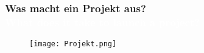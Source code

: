 \documentclass[13pt]{beamer}
\begin{document}
{
\begin{frame}
  \frametitle{Was macht ein Projekt aus? \\ \textcolor{white}{What does it take to launch a project?}}
  \begin{figure}
  \texttt{[image: Projekt.png]}
  \end{figure}
  \bigskip
\end{frame}
}
\end{document}

